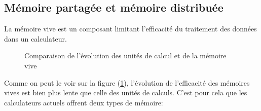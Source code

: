 \documentclass[fleqn,11pt]{article}
\begin{document}
\subsection{Mémoire partagée et mémoire distribuée}

La mémoire vive est un composant limitant l'efficacité du traitement des données dans un calculateur. 

\begin{figure}
\begin{center}
\end{center}
\caption{Comparaison de l'évolution des unités de calcul et de la mémoire vive}
\label{fig:compucram}
\end{figure}

Comme on peut le voir sur la figure (\ref {fig:compucram}), l'évolution de l'efficacité des mémoires vives est bien plus lente que celle des unités de calculs. C'est pour cela que  les calculateurs actuels offrent deux types de mémoire:
\end{document}
